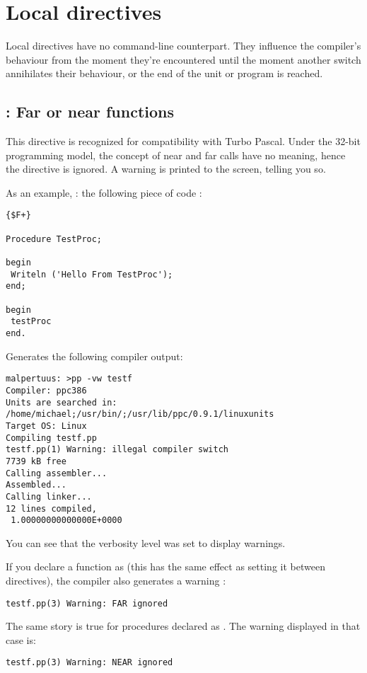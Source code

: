 \documentclass{report}
\begin{document}
\section{Local directives}
\label{se:LocalSwitch}
Local directives have no command-line counterpart. They influence the
compiler's behaviour from the moment they're encountered until the moment
another switch annihilates their behaviour, or the end of the unit or
program is reached. 

\subsection{ : Far or near functions}
This directive is recognized for compatibility with Turbo Pascal. Under the
32-bit programming model, the concept of near and far calls have no meaning,
hence the directive is ignored. A warning is printed to the screen, telling
you so.

As an example, : the following piece of code :
\begin{verbatim}
{$F+}

Procedure TestProc;

begin
 Writeln ('Hello From TestProc');
end;

begin
 testProc
end.
\end{verbatim}
Generates the following compiler output:
\begin{verbatim}
malpertuus: >pp -vw testf
Compiler: ppc386
Units are searched in: /home/michael;/usr/bin/;/usr/lib/ppc/0.9.1/linuxunits
Target OS: Linux
Compiling testf.pp
testf.pp(1) Warning: illegal compiler switch
7739 kB free
Calling assembler...
Assembled...
Calling linker...
12 lines compiled,
 1.00000000000000E+0000
\end{verbatim}
You can see that the verbosity level was set to display warnings.

If you declare a function as  (this has the same effect as setting it
between  directives), the compiler also generates a
warning :
\begin{verbatim}
testf.pp(3) Warning: FAR ignored
\end{verbatim}

The same story is true for procedures declared as . The warning
displayed in that case is:
\begin{verbatim}
testf.pp(3) Warning: NEAR ignored
\end{verbatim}
\end{document}
